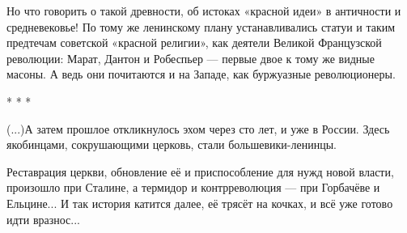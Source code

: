 Но что говорить о такой древности, об истоках «красной идеи» в античности и
средневековье! По тому же ленинскому плану устанавливались статуи и таким
предтечам советской «красной религии», как деятели Великой Французской
революции: Марат, Дантон и Робеспьер — первые двое к тому же видные масоны. А
ведь они почитаются и на Западе, как буржуазные революционеры.

* * *

(...)А затем прошлое откликнулось эхом через сто лет, и уже в России. Здесь
якобинцами, сокрушающими церковь, стали большевики­-ленинцы.

Реставрация церкви, обновление её и приспособление для нужд новой власти,
произошло при Сталине, а термидор и контр­революция — при Горбачёве и
Ельцине... И так история катится далее, её трясёт на кочках, и всё уже готово
идти вразнос... 
\endgroup

